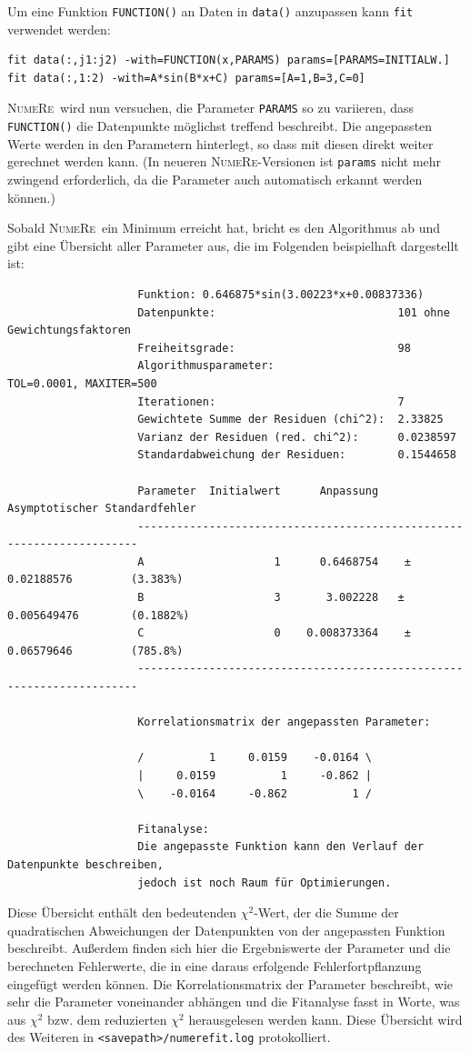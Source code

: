 \documentclass[DIV=14,headsepline,footsepline]{scrbook}
\newcommand{\NR}{\textsc{Nu\-me\-Re}}
\begin{document}
				Um eine Funktion \lstinline+FUNCTION()+ an Daten in \lstinline+data()+ anzupassen kann \lstinline+fit+ verwendet werden:
				\begin{lstlisting}
fit data(:,j1:j2) -with=FUNCTION(x,PARAMS) params=[PARAMS=INITIALW.]
fit data(:,1:2) -with=A*sin(B*x+C) params=[A=1,B=3,C=0]
				\end{lstlisting}
				\NR\ wird nun versuchen, die Parameter \lstinline+PARAMS+ so zu variieren, dass \lstinline+FUNCTION()+ die Datenpunkte möglichst treffend beschreibt. Die angepassten Werte werden in den Parametern hinterlegt, so dass mit diesen direkt weiter gerechnet werden kann. (In neueren \NR-Versionen ist \lstinline+params+ nicht mehr zwingend erforderlich, da die Parameter auch automatisch erkannt werden können.)
				
				Sobald \NR\ ein Minimum erreicht hat, bricht es den Algorithmus ab und gibt eine Übersicht aller Parameter aus, die im Folgenden beispielhaft dargestellt ist:
				\begin{verbatim}
					Funktion: 0.646875*sin(3.00223*x+0.00837336)
					Datenpunkte:                            101 ohne Gewichtungsfaktoren
					Freiheitsgrade:                         98
					Algorithmusparameter:                   TOL=0.0001, MAXITER=500
					Iterationen:                            7
					Gewichtete Summe der Residuen (chi^2):  2.33825
					Varianz der Residuen (red. chi^2):      0.0238597
					Standardabweichung der Residuen:        0.1544658

					Parameter  Initialwert      Anpassung    Asymptotischer Standardfehler
					----------------------------------------------------------------------
					A                    1      0.6468754    ± 0.02188576         (3.383%)
					B                    3       3.002228   ± 0.005649476        (0.1882%)
					C                    0    0.008373364    ± 0.06579646         (785.8%)
					----------------------------------------------------------------------

					Korrelationsmatrix der angepassten Parameter:

					/          1     0.0159    -0.0164 \
					|     0.0159          1     -0.862 |
					\    -0.0164     -0.862          1 /

					Fitanalyse:
					Die angepasste Funktion kann den Verlauf der Datenpunkte beschreiben,
					jedoch ist noch Raum für Optimierungen.
				\end{verbatim}
				Diese Übersicht enthält den bedeutenden $\chi^2$-Wert, der die Summe der quadratischen Abweichungen der Datenpunkten von der angepassten Funktion beschreibt. Außerdem finden sich hier die Ergebniswerte der Parameter und die berechneten Fehlerwerte, die in eine daraus erfolgende Fehlerfortpflanzung eingefügt werden können. Die Korrelationsmatrix der Parameter beschreibt, wie sehr die Parameter voneinander abhängen und die Fitanalyse fasst in Worte, was aus $\chi^2$ bzw. dem reduzierten $\chi^2$ herausgelesen werden kann. Diese Übersicht wird des Weiteren in \verb+<savepath>/numerefit.log+ protokolliert.
\end{document}
